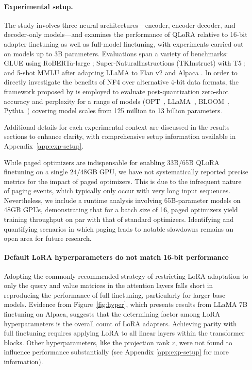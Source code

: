 \paragraph{Experimental setup.} The study involves three neural architectures—encoder, encoder-decoder, and decoder-only models—and examines the performance of QLoRA relative to 16-bit adapter finetuning as well as full-model finetuning, with experiments carried out on models up to 3B parameters. Evaluations span a variety of benchmarks: GLUE \citep{wang2018glue} using RoBERTa-large \citep{liu2019roberta}; Super-NaturalInstructions (TKInstruct) \citep{wang2022super} with T5 \citep{t5}; and 5-shot MMLU \citep{hendrycksmeasuring} after adapting LLaMA to Flan v2 \citep{longpre2023flan} and Alpaca \citep{alpaca}. In order to directly investigate the benefits of NF4 over alternative 4-bit data formats, the framework proposed by \citet{dettmers2022case} is employed to evaluate post-quantization zero-shot accuracy and perplexity for a range of models (OPT~\citep{zhang2022opt}, LLaMA~\citep{touvron2023llama}, BLOOM~\citep{scao2022bloom}, Pythia~\citep{biderman2023pythia}) covering model scales from 125 million to 13 billion parameters.

Additional details for each experimental context are discussed in the results sections to enhance clarity, with comprehensive setup information available in Appendix~\ref{app:exp-setup}.

While paged optimizers are indispensable for enabling 33B/65B \textsc{QLoRA} finetuning on a single 24/48GB GPU, we have not systematically reported precise metrics for the impact of paged optimizers. This is due to the infrequent nature of paging events, which typically only occur with very long input sequences. Nevertheless, we include a runtime analysis involving 65B-parameter models on 48GB GPUs, demonstrating that for a batch size of 16, paged optimizers yield training throughput on par with that of standard optimizers. Identifying and quantifying scenarios in which paging leads to notable slowdowns remains an open area for future research.

\paragraph{Default LoRA hyperparameters do not match 16-bit performance} 

Adopting the commonly recommended strategy of restricting LoRA adaptation to only the query and value matrices in the attention layers \citep{hu2021lora} falls short in reproducing the performance of full finetuning, particularly for larger base models. Evidence from Figure~\ref{fig:hyper}, which presents results from LLaMA 7B finetuning on Alpaca, suggests that the determining factor among LoRA hyperparameters is the overall count of LoRA adapters. Achieving parity with full finetuning requires applying LoRA to all linear layers within the transformer blocks. Other hyperparameters, like the projection rank $r$, were not found to influence performance substantially (see Appendix \ref{app:exp-setup} for more information).


